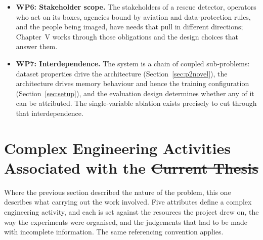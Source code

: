 \documentclass[12pt,a4paper,oneside]{report}
\providecommand{\DIFadd}[1]{{\protect\color{blue}\uwave{#1}}} %
\providecommand{\DIFdel}[1]{{\protect\color{red}\sout{#1}}}                      %
\providecommand{\DIFaddbegin}{} %
\providecommand{\DIFaddend}{} %
\providecommand{\DIFdelbegin}{} %
\providecommand{\DIFdelend}{} %
\begin{document}
\begin{itemize}
        (Sections~\ref{sec:metrics} and~\ref{sec:protocol}) had to be designed for the problem.
  \item \textbf{WP6: Stakeholder scope.} The stakeholders of a rescue
        detector, operators who act on its boxes, agencies bound by aviation
        and data-protection rules, and the people being imaged, have needs
        that pull in different directions; Chapter~V works through those
        obligations and the design choices that answer them.
  \item \textbf{WP7: Interdependence.} The system is a chain of coupled
        sub-problems: dataset properties drive the architecture
        (Section~\ref{sec:p2novel}), the architecture drives memory behaviour and hence
        the training configuration (Section~\ref{sec:setup}), and the evaluation design
        determines whether any of it can be attributed. The single-variable
        ablation exists precisely to cut through that interdependence.
\end{itemize}

\section{Complex Engineering Activities Associated with the \DIFdelbegin \DIFdel{Current Thesis}\DIFdelend \DIFaddbegin \DIFadd{Work}\DIFaddend }

Where the previous section described the nature of the problem, this one
describes what carrying out the work involved. Five attributes define a complex
engineering activity, and each is set against the resources the project drew on,
the way the experiments were organised, and the judgements that had to be made
with incomplete information. The same referencing convention applies.
\end{document}
